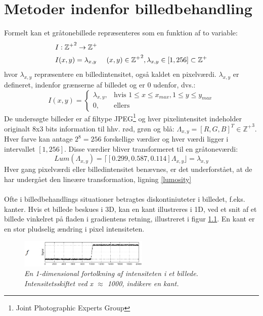 \chapter{Metoder indenfor billedbehandling}\label{subsec:kant}
Formelt kan et gråtonebillede repræsenteres som en funktion af to variable:
\begin{equation}
\begin{split}
&I: \mathbb{\mathbb{Z^+}}^2 \rightarrow \mathbb{Z}^+ \\
&I(x,y) = \lambda_{x,y} \hspace{0.5 cm} (x,y)\in \mathbb{Z^+}^2, \lambda_{x,y} \in [1,256] \subset \mathbb{Z^+}
\end{split}
\label{bf}
\end{equation}
hvor $\lambda_{x,y}$ repræsentere en billedintensitet, også kaldet en pixelværdi. $\lambda_{x,y}$ er defineret, indenfor grænserne af billedet og er 0 udenfor, dvs.: 
\begin{equation}
 I(x, y) =
\begin{cases}
    \lambda_{x,y}, & \text{hvis } 1 \leq x \leq x_{max}, 1 \leq y \leq y_{max} \\
    0,              & \text{ellers}
    \label{pixelintensitet}
\end{cases}
\end{equation}
De undersøgte billeder er af filtype JPEG\footnote{Joint Photographic Experts Group} og hver pixelintensitet indeholder originalt 8x3 bits information til hhv. rød, grøn og blå: $\Lambda_{x,y} = [R,G,B]^T \in \mathbb{\mathbb{Z^+}}^3$. Hver farve kan antage $2^8 = 256$ forskellige værdier og hver værdi ligger i intervallet $[1,256]$. Disse værdier bliver transformeret til en gråtoneværdi:
\begin{equation}
Lum(\Lambda_{x,y}) = \lceil	[0.299, 0.587, 0.114] \Lambda_{x,y} \rfloor	 = \lambda_{x,y}
\label{lumosity}
\end{equation}  
Hver gang pixelværdi eller billedintensitet benævnes, er det underforstået, at de har undergået den lineære transformation, ligning \eqref{lumosity} 
\\
\\
Ofte i billedbehandlings situationer betragtes diskontiniuteter i billedet, f.eks. kanter.
Hvis et billede beskues i 3D, kan en kant illustreres i 1D, ved et snit af et billede vinkelret på fladen i gradientens retning, illustreret i figur \ref{fig:kant}. En kant er en stor pludselig ændring i pixel intensiteten.
\noindent
\begin{figure}[H]
    \centering
    \includegraphics[width=0.55\textwidth]{fig/7.png}
     \vspace{-1em}
    \begin{center}        
     \caption{{\footnotesize \textit{
En 1-dimensional fortolkning af intensiteten i et billede. Intensitetsskiftet ved x $\approx$ 1000, indikere en kant.}}}
    \label{fig:kant}
     \end{center}
       \vspace{-2.5em}
  \end{figure}
